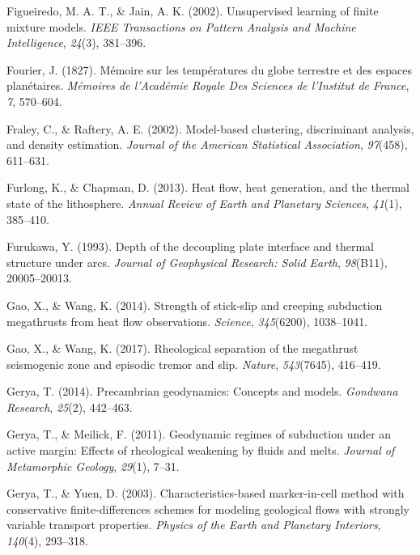 \begin{CSLReferences}{1}{1}
\leavevmode{}%
Figueiredo, M. A. T., \& Jain, A. K. (2002). Unsupervised learning of finite mixture models. \emph{IEEE Transactions on Pattern Analysis and Machine Intelligence}, \emph{24}(3), 381--396.

\leavevmode{}%
Fourier, J. (1827). Mémoire sur les températures du globe terrestre et des espaces planétaires. \emph{Mémoires de l'Académie Royale Des Sciences de l'Institut de France}, \emph{7}, 570--604.

\leavevmode{}%
Fraley, C., \& Raftery, A. E. (2002). Model-based clustering, discriminant analysis, and density estimation. \emph{Journal of the American Statistical Association}, \emph{97}(458), 611--631.

\leavevmode{}%
Furlong, K., \& Chapman, D. (2013). Heat flow, heat generation, and the thermal state of the lithosphere. \emph{Annual Review of Earth and Planetary Sciences}, \emph{41}(1), 385--410.

\leavevmode{}%
Furukawa, Y. (1993). Depth of the decoupling plate interface and thermal structure under arcs. \emph{Journal of Geophysical Research: Solid Earth}, \emph{98}(B11), 20005--20013.

\leavevmode{}%
Gao, X., \& Wang, K. (2014). Strength of stick-slip and creeping subduction megathrusts from heat flow observations. \emph{Science}, \emph{345}(6200), 1038--1041.

\leavevmode{}%
Gao, X., \& Wang, K. (2017). Rheological separation of the megathrust seismogenic zone and episodic tremor and slip. \emph{Nature}, \emph{543}(7645), 416--419.

\leavevmode{}%
Gerya, T. (2014). Precambrian geodynamics: Concepts and models. \emph{Gondwana Research}, \emph{25}(2), 442--463.

\leavevmode{}%
Gerya, T., \& Meilick, F. (2011). Geodynamic regimes of subduction under an active margin: Effects of rheological weakening by fluids and melts. \emph{Journal of Metamorphic Geology}, \emph{29}(1), 7--31.

\leavevmode{}%
Gerya, T., \& Yuen, D. (2003). Characteristics-based marker-in-cell method with conservative finite-differences schemes for modeling geological flows with strongly variable transport properties. \emph{Physics of the Earth and Planetary Interiors}, \emph{140}(4), 293--318.


\end{CSLReferences}
